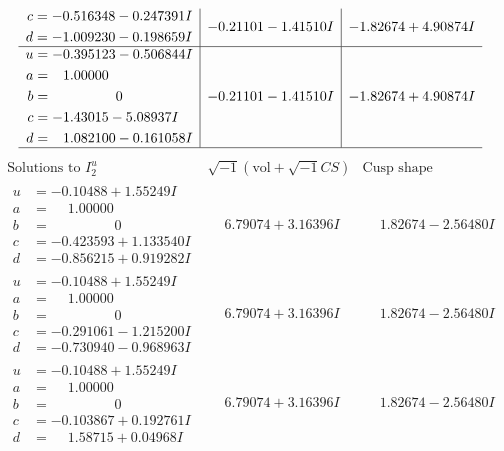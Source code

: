 \documentclass[1p]{elsarticle_modified}
\theoremstyle{definition}
\newcommand{\I}{\sqrt{-1}}
\begin{document}
$$\begin{array}{c|c|c}
\begin{aligned}
c &= -0.516348 - 0.247391 I \\
d &= -1.009230 - 0.198659 I\end{aligned}
 & -0.21101 - 1.41510 I & -1.82674 + 4.90874 I \\ \hline\begin{aligned}
u &= -0.395123 - 0.506844 I \\
a &= \phantom{-}1.00000\phantom{ +0.000000I} \\
b &= \phantom{-0.000000 } 0 \\
c &= -1.43015 - 5.08937 I \\
d &= \phantom{-}1.082100 - 0.161058 I\end{aligned}
 & -0.21101 - 1.41510 I & -1.82674 + 4.90874 I\\
 \hline 
 \end{array}$$\newpage$$\begin{array}{c|c|c}  
\text{Solutions to }I^u_{2}& \I (\text{vol} + \sqrt{-1}CS) & \text{Cusp shape}\\
 \hline 
\begin{aligned}
u &= -0.10488 + 1.55249 I \\
a &= \phantom{-}1.00000\phantom{ +0.000000I} \\
b &= \phantom{-0.000000 } 0 \\
c &= -0.423593 + 1.133540 I \\
d &= -0.856215 + 0.919282 I\end{aligned}
 & \phantom{-}6.79074 + 3.16396 I & \phantom{-}1.82674 - 2.56480 I \\ \hline\begin{aligned}
u &= -0.10488 + 1.55249 I \\
a &= \phantom{-}1.00000\phantom{ +0.000000I} \\
b &= \phantom{-0.000000 } 0 \\
c &= -0.291061 - 1.215200 I \\
d &= -0.730940 - 0.968963 I\end{aligned}
 & \phantom{-}6.79074 + 3.16396 I & \phantom{-}1.82674 - 2.56480 I \\ \hline\begin{aligned}
u &= -0.10488 + 1.55249 I \\
a &= \phantom{-}1.00000\phantom{ +0.000000I} \\
b &= \phantom{-0.000000 } 0 \\
c &= -0.103867 + 0.192761 I \\
d &= \phantom{-}1.58715 + 0.04968 I\end{aligned}
 & \phantom{-}6.79074 + 3.16396 I & \phantom{-}1.82674 - 2.56480 I \\ \hline\begin{aligned}

\end{aligned}
\end{array}$$
\end{document}
